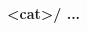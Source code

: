 \begin{description}
\begin{addmargin}[0em]{0em}
\end{addmargin} %

\textbf{\\\\\\}
\item\textbf{<cat>/ ...} %


\end{description}
